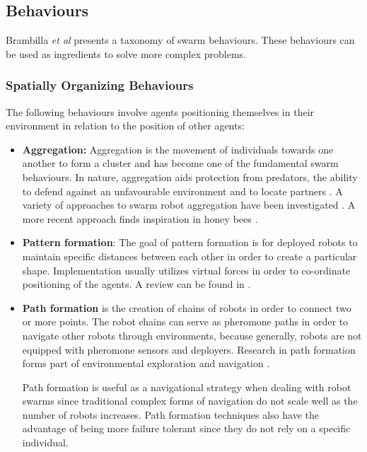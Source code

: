 \subsection{Behaviours}
\label{swarmrobotapplications}

Brambilla \textit{et al} \cite{brambilla2013swarm} presents a taxonomy of swarm behaviours. These behaviours can be used as ingredients to solve more complex problems.

\subsubsection{Spatially Organizing Behaviours}
The following behaviours involve agents positioning themselves in their environment in relation to the position of other agents:

\begin{itemize}
	\item \textbf{Aggregation:} Aggregation is the movement of individuals towards one another to form a cluster and has become one of the fundamental swarm behaviours. In nature, aggregation aids protection from predators, the ability to defend against an unfavourable environment and to locate partners \cite{bonabeau2001self}. A variety of approaches to swarm robot aggregation have been investigated \cite{yan2011algorithm, soysal2007aggregation, trianni2003evolving}. A more recent approach finds inspiration in honey bees \cite{schmickl2011beeclust, schmickl2009two}.
	
	\item \textbf{Pattern formation}:
	The goal of pattern formation is for deployed robots to maintain specific distances between each other in order to create a particular shape. Implementation usually utilizes virtual forces in order to co-ordinate positioning of the agents. A review can be found in \cite{bahceci2003review, hettiarachchi2009review}.
	
	\item \textbf{Path formation} is the creation of chains of robots in order to connect two or more points. The robot chains can serve as pheromone paths in order to navigate other robots through environments, because generally, robots are not equipped with pheromone sensors and deployers. Research in path formation forms part of environmental exploration and navigation \cite{nouyan2006chain}. 
	
	Path formation is useful as a navigational strategy when dealing with robot swarms since traditional complex forms of navigation do not scale well as the number of robots increases. Path formation techniques also have the advantage of being more failure tolerant since they do not rely on a specific individual.
	

\end{itemize}
